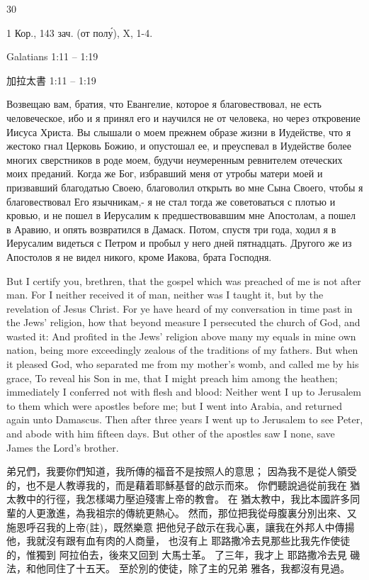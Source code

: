 30

\onehalfspacing %

\doublespacing %

\Large%

1 Кор., 143 зач. (от полу́), X, 1-4.

Galatians 1:11 -- 1:19

加拉太書 1:11 -- 1:19

Возвещаю вам, братия, что Евангелие, которое я благовествовал, не есть человеческое,
ибо и я принял его и научился не от человека, но через откровение Иисуса Христа.
Вы слышали о моем прежнем образе жизни в Иудействе, что я жестоко гнал Церковь Божию, и опустошал ее,
и преуспевал в Иудействе более многих сверстников в роде моем, будучи неумеренным ревнителем отеческих моих преданий.
Когда же Бог, избравший меня от утробы матери моей и призвавший благодатью Своею, благоволил
открыть во мне Сына Своего, чтобы я благовествовал Его язычникам,- я не стал тогда же советоваться с плотью и кровью,
и не пошел в Иерусалим к предшествовавшим мне Апостолам, а пошел в Аравию, и опять возвратился в Дамаск.
Потом, спустя три года, ходил я в Иерусалим видеться с Петром и пробыл у него дней пятнадцать.
Другого же из Апостолов я не видел никого, кроме Иакова, брата Господня. 

But I certify you, brethren, that the gospel which was preached of me is not after man.
For I neither received it of man, neither was I taught it, but by the revelation of Jesus Christ.
For ye have heard of my conversation in time past in the Jews' religion, how that beyond measure I persecuted the church of God, and wasted it:
And profited in the Jews' religion above many my equals in mine own nation, being more exceedingly zealous of the traditions of my fathers.
But when it pleased God, who separated me from my mother's womb, and called me by his grace,
To reveal his Son in me, that I might preach him among the heathen; immediately I conferred not with flesh and blood:
Neither went I up to Jerusalem to them which were apostles before me; but I went into Arabia, and returned again unto Damascus.
Then after three years I went up to Jerusalem to see Peter, and abode with him fifteen days.
But other of the apostles saw I none, save James the Lord's brother.

弟兄們，我要你們知道，我所傳的福音不是按照人的意思；
因為我不是從人領受的，也不是人教導我的，而是藉着耶穌基督的啟示而來。
你們聽說過從前我在 猶太教中的行徑，我怎樣竭力壓迫殘害上帝的教會。
在 猶太教中，我比本國許多同輩的人更激進，為我祖宗的傳統更熱心。
然而，那位把我從母腹裏分別出來、又施恩呼召我的上帝(註)，既然樂意
把他兒子啟示在我心裏，讓我在外邦人中傳揚他，我就沒有跟有血有肉的人商量，
也沒有上 耶路撒冷去見那些比我先作使徒的，惟獨到 阿拉伯去，後來又回到 大馬士革。
了三年，我才上 耶路撒冷去見 磯法，和他同住了十五天。
至於別的使徒，除了主的兄弟 雅各，我都沒有見過。 
